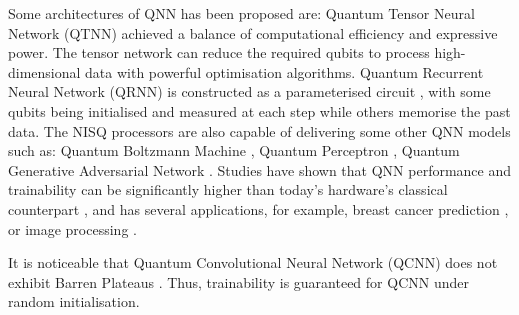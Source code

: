 Some architectures of QNN has been proposed are: 
Quantum Tensor Neural Network (QTNN) \cite{hugginsQuantumMachineLearning2019} achieved a balance of computational efficiency and expressive power. 
The tensor network can reduce the required qubits to process high-dimensional data with powerful optimisation algorithms.
Quantum Recurrent Neural Network (QRNN) is constructed as a parameterised circuit \cite{takakiLearningTemporalData2021}, with some qubits being initialised and measured at each step while others memorise the past data.
The NISQ processors are also capable of delivering some other QNN models such as: 
Quantum Boltzmann Machine \cite{shinguBoltzmannMachineLearning2021, zoufalVariationalQuantumBoltzmann2021}, 
Quantum Perceptron \cite{kristensenArtificialSpikingQuantum2021}, 
Quantum Generative Adversarial Network \cite{dallaire-demersQuantumGenerativeAdversarial2018, lloydQuantumGenerativeAdversarial2018}. 
Studies have shown that QNN performance and trainability can be significantly higher than today's hardware's classical counterpart \cite{abbasPowerQuantumNeural2021, colesSeekingQuantumAdvantage2021}, and has several applications, for example, breast cancer prediction \cite{liModelAlgorithmQuantuminspired2014}, or image processing \cite{matsuiQubitNeuralNetwork2009}.

It is noticeable that Quantum Convolutional Neural Network (QCNN) does not exhibit Barren Plateaus \cite{pesahAbsenceBarrenPlateaus2021}.
Thus, trainability is guaranteed for QCNN under random initialisation.